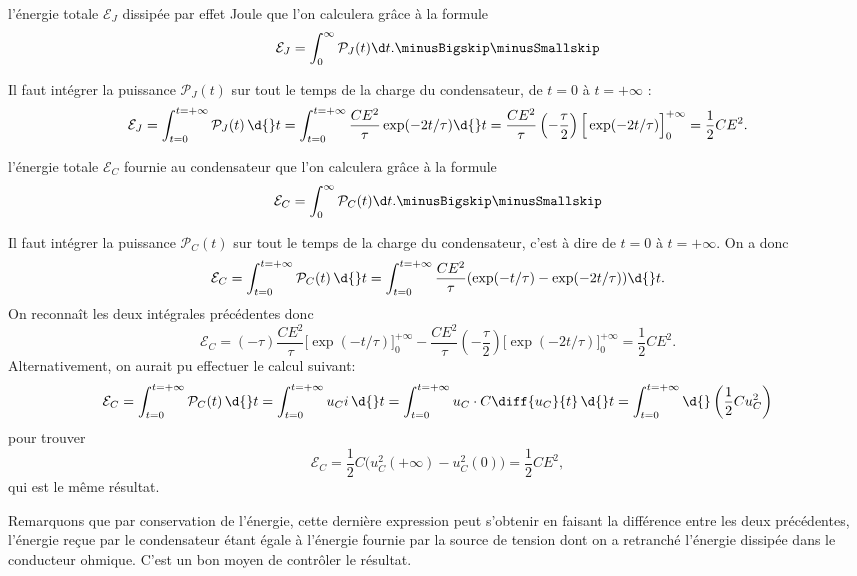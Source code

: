 


\begin{enonce}
l'énergie totale $\mathcal{E}_J$ dissipée par effet Joule que l'on calculera grâce à la formule \minusSmallskip
\[
\mathcal{E}_J = \int_0^\infty  \mathcal{P}_J(t) \d t.\minusBigskip\minusSmallskip
\]
\end{enonce}


\begin{corrige}
Il faut intégrer la puissance $\mathcal{P}_J(t)$ sur tout le temps de la charge du condensateur, de $t=0$ à $t=+\infty$ : 
\[
\mathcal{E}_J=\int_{t=0}^{t=+\infty} \mathcal{P}_J(t) \, \d{}t  = \int_{t=0}^{t=+\infty} \frac{CE^2}{\tau}\exp(-2t/\tau) \d{}t = \frac{CE^2}{\tau} \left(-\frac{\tau}{2} \right) \Big[\exp(-2t/\tau)\Big]_0^{+\infty} =\frac{1}{2} CE^2.
\]
\end{corrige}





\begin{enonce}
l'énergie totale $\mathcal{E}_C$ fournie au condensateur que l'on calculera grâce à la formule \minusSmallskip
\[
\mathcal{E}_C = \int_0^\infty  \mathcal{P}_C(t) \d t.\minusBigskip\minusSmallskip
\]
\end{enonce}


\begin{corrige}
Il faut intégrer la puissance $\mathcal{P}_C(t)$ sur tout le temps de la charge du condensateur, c'est à dire de $t=0$ à $t=+\infty$. On a donc
\[
\mathcal{E}_C=\int_{t=0}^{t=+\infty} \mathcal{P}_C(t) \, \d{}t  = \int_{t=0}^{t=+\infty} \frac{CE^2}{\tau}(\exp(-t/\tau)-\exp(-2t/\tau)) \d{}t. 
\]
On  reconnaît les deux intégrales précédentes donc
\[
\mathcal{E}_C=  (-\tau) \frac{CE^2}{\tau} \Big[\exp(-t/\tau)\Big]_0^{+\infty} - \frac{CE^2}{\tau} \left(-\frac{\tau}{2} \right) \Big[\exp(-2t/\tau)\Big]_0^{+\infty}=\frac{1}{2}CE^2.
\]
Alternativement, on aurait pu effectuer le calcul suivant:
\[
\mathcal{E}_C=\int_{t=0}^{t=+\infty} \mathcal{P}_C(t) \, \d{}t=\int_{t=0}^{t=+\infty} u_C i \, \d{}t =\int_{t=0}^{t=+\infty} u_C \cdot C \diff{u_C}{t} \, \d{}t= \int_{t=0}^{t=+\infty} \d{} \left(\frac{1}{2}Cu_C^2 \right) 
\]
pour trouver
\[
\mathcal{E}_C=\frac{1}{2}C\Big(u_C^2(+\infty)-u_C^2(0)\Big)=\frac{1}{2}CE^2,
\]
qui est le même résultat.

Remarquons que par conservation de l'énergie, cette dernière expression peut s'obtenir en faisant la différence entre les deux précédentes, l'énergie reçue par le condensateur étant égale à l'énergie fournie par la source de tension dont on a retranché l'énergie dissipée dans le conducteur ohmique. C'est un bon moyen de contrôler le résultat.
\end{corrige}

